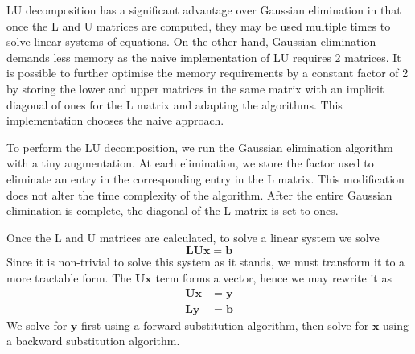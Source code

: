 \documentclass[12pt, a4paper]{article}
\begin{document}
LU decomposition has a significant advantage over Gaussian elimination in that
once the L and U matrices are computed, they may be used multiple times to solve
linear systems of equations. On the other hand, Gaussian elimination demands
less memory as the naive implementation of LU requires 2 matrices. It is
possible to further optimise the memory requirements by a constant factor of 2
by storing the lower and upper matrices in the same matrix with an implicit
diagonal of ones for the L matrix and adapting the algorithms. This
implementation chooses the naive approach.

To perform the LU decomposition, we run the Gaussian elimination algorithm with
a tiny augmentation. At each elimination, we store the factor used to eliminate
an entry in the corresponding entry in the L matrix. This modification does not
alter the time complexity of the algorithm. After the entire Gaussian
elimination is complete, the diagonal of the L matrix is set to ones.

Once the L and U matrices are calculated, to solve a linear system we solve
\begin{equation*}
  \bm{L}\bm{U}\bm{x} = \bm{b}
\end{equation*}
Since it is non-trivial to solve this system as it stands, we must transform it
to a more tractable form. The $\bm{U}\bm{x}$ term forms a vector, hence we may
rewrite it as
\begin{align*}
  \bm{U}\bm{x} &= \bm{y} \\
  \bm{L}\bm{y} &= \bm{b}
\end{align*}
We solve for $\bm{y}$ first using a forward substitution algorithm, then
solve for $\bm{x}$ using a backward substitution algorithm.
\end{document}
